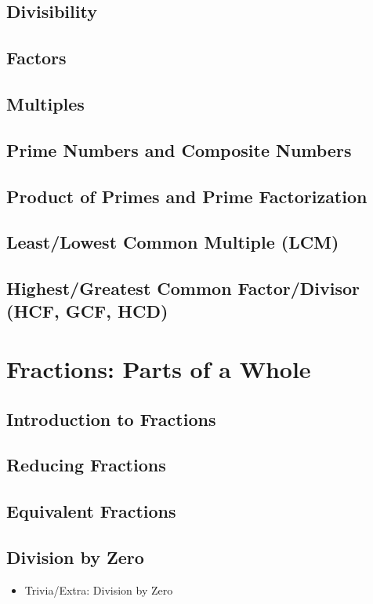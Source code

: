 \documentclass[11pt]{article}
\begin{document}
\subsection{Divisibility}
\subsection{Factors}
\subsection{Multiples}
\subsection{Prime Numbers and Composite Numbers}
\subsection{Product of Primes and Prime Factorization}
\subsection{Least/Lowest Common Multiple (LCM)}
\subsection{Highest/Greatest Common Factor/Divisor (HCF, GCF, HCD)}

\section{Fractions: Parts of a Whole}
\subsection{Introduction to Fractions}
\subsection{Reducing Fractions}
\subsection{Equivalent Fractions}
\subsection{Division by Zero}
\begin{itemize}
    \item Trivia/Extra: Division by Zero
\end{itemize}
\end{document}
